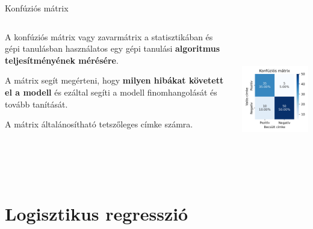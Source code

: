 \documentclass[english, aspectratio=169]{beamer}
\makeatletter
\let\origtableofcontents=\tableofcontents
\def\tableofcontents{\@ifnextchar[{\origtableofcontents}{\gobbletableofcontents}}
\def\gobbletableofcontents#1{\origtableofcontents}
\makeatother
\begin{document}
\begin{frame}{Konfúziós mátrix}
\begin{columns}
\begin{column}{.5\textwidth}
A konfúziós mátrix vagy zavarmátrix a statisztikában és gépi tanulásban használatos egy gépi tanulási \textbf{algoritmus teljesítményének mérésére}.\par\smallskip
A mátrix segít megérteni, hogy \textbf{milyen hibákat követett el a modell} és ezáltal segíti a modell finomhangolását és tovább tanítását.\par\smallskip
A mátrix általánosítható tetszőleges címke számra. 
\end{column}
\begin{column}{.5\textwidth}
\begin{center}
\includegraphics[width=7cm, height=6cm, keepaspectratio]{images/osztalyozas_17.png}
\end{center}
\end{column}
\end{columns}
\end{frame}

\section{Logisztikus regresszió}

\begin{frame}
\tableofcontents[currentsection]
\end{frame}
\end{document}

